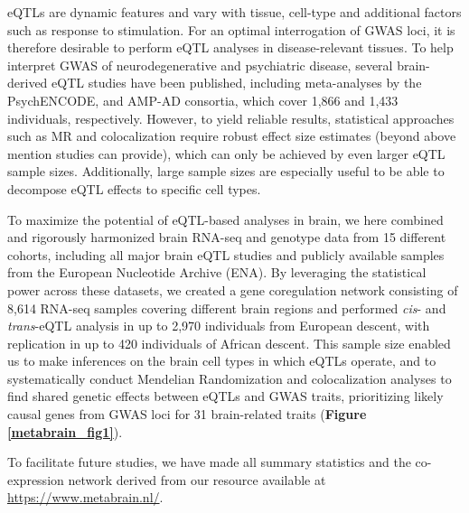 eQTLs are dynamic features and vary with tissue, cell-type and additional factors such as response to stimulation. For an optimal interrogation of GWAS loci, it is therefore desirable to perform eQTL analyses in disease-relevant tissues\cite{donovanCellularDeconvolutionGTEx2020}. To help interpret GWAS of neurodegenerative and psychiatric disease, several brain-derived eQTL studies have been published, including meta-analyses by the PsychENCODE\cite{wangComprehensiveFunctionalGenomic2018}, and AMP-AD\cite{rajIntegrativeTranscriptomeAnalyses2018} consortia, which cover 1,866 and 1,433 individuals, respectively. However, to yield reliable results, statistical approaches such as MR and colocalization require robust effect size estimates (beyond above mention studies can provide), which can only be achieved by even larger eQTL sample sizes. Additionally, large sample sizes are especially useful to be able to decompose eQTL effects to specific cell types. 

To maximize the potential of eQTL-based analyses in brain, we here combined and rigorously harmonized brain RNA-seq and genotype data from 15 different cohorts, including all major brain eQTL studies and publicly available samples from the European Nucleotide Archive (ENA). By leveraging the statistical power across these datasets, we created a gene coregulation network consisting of 8,614 RNA-seq samples covering different brain regions and performed \emph{cis}- and \emph{trans}-eQTL analysis in up to 2,970 individuals from European descent, with replication in up to 420 individuals of African descent. This sample size enabled us to make inferences on the brain cell types in which eQTLs operate, and to systematically conduct Mendelian Randomization and colocalization analyses to find shared genetic effects between eQTLs and GWAS traits, prioritizing likely causal genes from GWAS loci for 31 brain-related traits (\textbf{Figure \ref{metabrain_fig1}}).   

To facilitate future studies, we have made all summary statistics and the co-expression network derived from our resource available at \url{https://www.metabrain.nl/}. 

